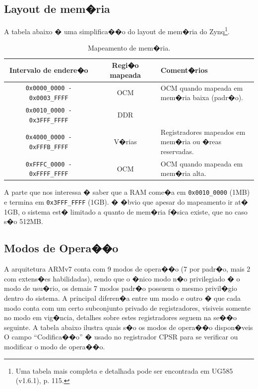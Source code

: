 \documentclass{ufscThesis/ufscThesis} %
\begin{document}
\subsection{Layout de mem�ria} 
A tabela abaixo � uma simplifica��o do layout de mem�ria do Zynq\footnote{Uma tabela mais completa e detalhada pode ser encontrada em UG585 (v1.6.1), p. 115.}.

\begin{table}[ht]

\centering
\begin{tabular}{ccp{5cm}}
\hline\hline                        %
Intervalo de endere�o  & Regi�o mapeada & Coment�rios\\ [0.5ex] %
\hline                  %
\verb+0x0000_0000 - 0x0003_FFFF+ & OCM & \parbox{5cm}{OCM quando mapeada em \\mem�ria baixa (padr�o).} \\
\verb+0x0010_0000 - 0x3FFF_FFFF+ & DDR &  \\
\verb+0x4000_0000 - 0xFFFB_FFFF+ & V�rias & \parbox{5cm}{Registradores mapeados em \\mem�ria ou �reas reservadas.} \\
\verb+0xFFFC_0000 - 0xFFFF_FFFF+ & OCM & \parbox{5cm}{OCM quando mapeada em \\mem�ria alta.}\\ [1ex]
\hline %
\end{tabular}
\caption{Mapeamento de mem�ria.}
\label{tab.memlayout} %
\end{table}

A parte que nos interessa � saber que a RAM come�a em \verb+0x0010_0000+ (1MB) e termina em \verb+0x3FFF_FFFF+ (1GB). � �bvio que apesar do mapeamento ir at� 1GB, o sistema est� limitado a quanto de mem�ria f�sica existe, que no caso s�o 512MB.




\subsection{Modos de Opera��o}
A arquitetura ARMv7 conta com 9 modos de opera��o (7 por padr�o, mais 2 com extens�es habilidadas), sendo que o �nico modo n�o privilegiado � o modo de usu�rio, os demais 7 modos padr�o possuem o mesmo privil�gio dentro do sistema. A principal diferen�a entre um modo e outro � que cada modo conta com um certo subconjunto privado de registradores, visiveis somente no modo em vig�ncia, detalhes sobre estes registradores seguem na se��o seguinte. A tabela abaixo ilustra quais s�o os modos de opera��o dispon�veis\cite[p.~1139]{armarm}%
O campo ``Codifica��o'' � usado no registrador CPSR para se verificar ou modificar o modo de opera��o.
\end{document}
